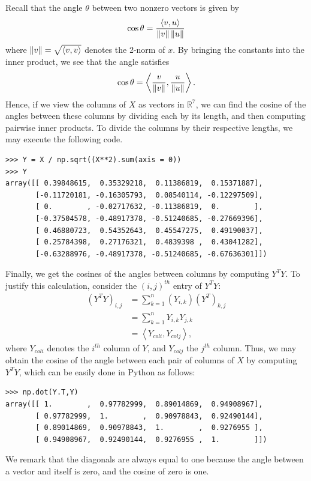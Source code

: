 Recall that the angle $\theta$ between two nonzero
vectors is given by
\[
\cos{\theta} = \frac{\langle v,u \rangle}{\left\lVert v\right\rVert\left\lVert u\right\rVert}
\]
where $\left\lVert v\right\rVert = \sqrt{\langle v,v \rangle}$ denotes the 2-norm of $x$.
By bringing the constants into the inner product, we see that the angle satisfies
\[
\cos{\theta} = \left\langle\frac{v}{\left\lVert v\right\rVert},\frac{u}{\left\lVert u\right\rVert}\right\rangle.
\]
Hence, if we view the columns of $X$ as vectors in $\mathbb{R}^7$, we can find the cosine of the angles between these columns by dividing each
by its length, and then computing pairwise inner products. To divide the columns by their respective lengths, we may execute the following
code.
\begin{lstlisting}
>>> Y = X / np.sqrt((X**2).sum(axis = 0))
>>> Y
array([[ 0.39848615,  0.35329218,  0.11386819,  0.15371887],
       [-0.11720181, -0.16305793,  0.08540114, -0.12297509],
       [ 0.        , -0.02717632, -0.11386819,  0.        ],
       [-0.37504578, -0.48917378, -0.51240685, -0.27669396],
       [ 0.46880723,  0.54352643,  0.45547275,  0.49190037],
       [ 0.25784398,  0.27176321,  0.4839398 ,  0.43041282],
       [-0.63288976, -0.48917378, -0.51240685, -0.67636301]])
\end{lstlisting}

Finally, we get the cosines of the angles between columns by computing $Y^T Y$. To justify this calculation, consider
the $(i,j)^{th}$ entry of $Y^T Y$:
\begin{align*}
(Y^T Y)_{i,j} &= \sum_{k=1}^n (Y_{i,k})(Y^T)_{k,j} \\
&= \sum_{k=1}^n Y_{i,k}Y_{j,k} \\
&= \left\langle Y_{col i}, Y_{col j} \right\rangle,
\end{align*}
where $Y_{col i}$ denotes the $i^{th}$ column of $Y$, and $Y_{col j}$ the $j^{th}$ column.
Thus, we may obtain the cosine of the angle between each pair of columns of $X$ by computing $Y^T Y$,
which can be easily done in Python as follows:
\begin{lstlisting}
>>> np.dot(Y.T,Y)
array([[ 1.        ,  0.97782999,  0.89014869,  0.94908967],
       [ 0.97782999,  1.        ,  0.90978843,  0.92490144],
       [ 0.89014869,  0.90978843,  1.        ,  0.9276955 ],
       [ 0.94908967,  0.92490144,  0.9276955 ,  1.        ]])
\end{lstlisting}

We remark that the diagonals are always equal to one because the angle between a vector and itself is zero, and the cosine of zero is one.

